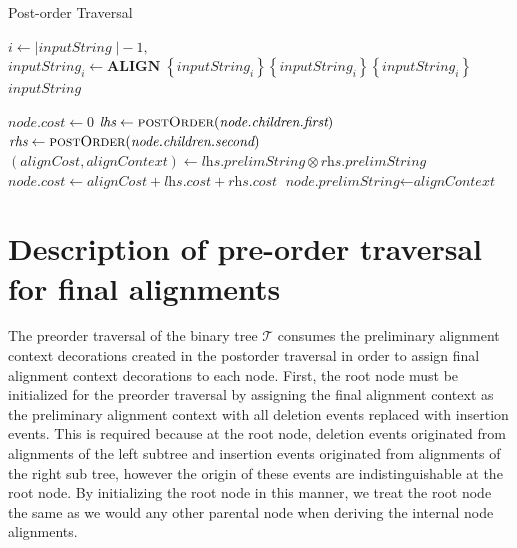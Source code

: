 \documentclass[11pt]{article}
\begin{document}
\begin{algorithm}
  \caption{Post-order Traversal}\label{postOrder}
  \begin{algorithmic}[1]
    \Ensure{$\Sigma_{\Gamma}^{*}$ }
      \State $i \gets \vert\textit{inputString} \;\vert - 1,$
        \State $\textit{inputString}_i \gets \textbf{ALIGN} \; \left\{ \textit{inputString}_i\right\} \left\{ \textit{inputString}_i \right\} \left\{ \textit{inputString}_i \right\}$
      \EndWhile
      \Return $\textit{inputString}$
    \EndFunction

        \State $\textit{node.cost} \gets 0$
      \Else
        \State $\textit{lhs}  \gets \Call{postOrder}{\textit{node.children.first}}$
        \State $\textit{rhs}  \gets \Call{postOrder}{\textit{node.children.second}}$
        \State $\left(\textit{alignCost}, \textit{alignContext}\right) \gets \textit{lhs.prelimString} \otimes \textit{rhs.prelimString}$
        \State $\textit{node.cost} \gets \textit{alignCost} + \textit{lhs.cost} + \textit{rhs.cost}$
        \State $\textit{node.prelimString} \gets \textit{alignContext}$
      \EndIf
    \EndFunction
  \end{algorithmic}
\end{algorithm}


\section{Description of pre-order traversal for final alignments}
The preorder traversal of the binary tree $\mathcal{T}$ consumes the preliminary alignment context decorations created in the postorder traversal in order to assign final alignment context decorations to each node.
First, the root node must be initialized for the preorder traversal by assigning the final alignment context as the preliminary alignment context with all deletion events replaced with insertion events.
This is required because at the root node, deletion events originated from  alignments of the left subtree and insertion events originated from alignments of the right sub tree, however the origin of these events are indistinguishable at the root node.
By initializing the root node in this manner, we treat the root node the same as we would any other parental node when deriving the internal node alignments.
\end{document}
